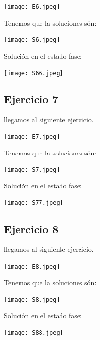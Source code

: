 \documentclass[12pt]{article}
\begin{document}
\begin{center}
    \texttt{[image: E6.jpeg]}
\end{center}

Tenemos que la soluciones són:

\begin{center}
    \texttt{[image: S6.jpeg]}
\end{center}

Solución en el estado fase:

\begin{center}
    \texttt{[image: S66.jpeg]}
\end{center}




\subsection*{Ejercicio 7}
llegamos al siguiente ejercicio.

\begin{center}
    \texttt{[image: E7.jpeg]}
\end{center}

Tenemos que la soluciones són:

\begin{center}
    \texttt{[image: S7.jpeg]}
\end{center}

Solución en el estado fase:

\begin{center}
    \texttt{[image: S77.jpeg]}
\end{center}




\subsection*{Ejercicio 8}
llegamos al siguiente ejercicio.

\begin{center}
    \texttt{[image: E8.jpeg]}
\end{center}

Tenemos que la soluciones són:

\begin{center}
    \texttt{[image: S8.jpeg]}
\end{center}

Solución en el estado fase:

\begin{center}
    \texttt{[image: S88.jpeg]}
\end{center}
\end{document}
